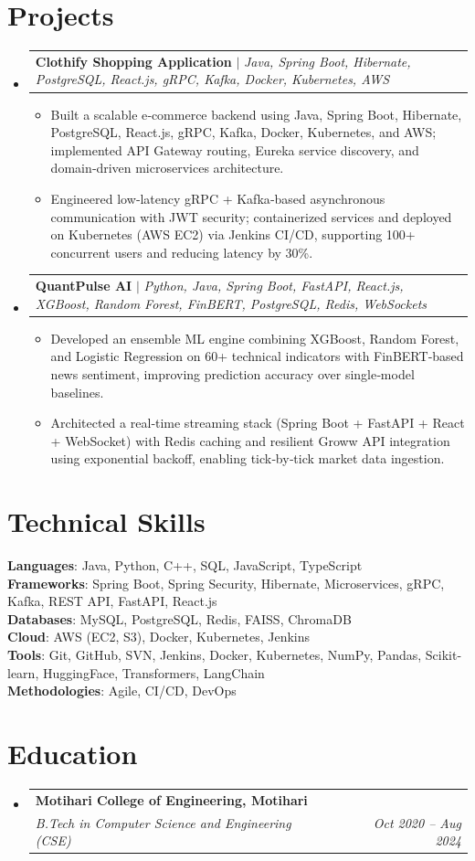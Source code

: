 \documentclass[10pt, letterpaper]{article}
\makeatletter
\newcommand{\resumeItem}[1]{
  \item\small{
    {#1 \vspace{-2pt}}
  }
}
\newcommand{\resumeSubheading}[4]{
  \vspace{-2pt}\item
    \begin{tabular*}{1.0\textwidth}[t]{l@{\extracolsep{\fill}}r}
      \textbf{#1} & \textbf{\small #2} \\
      \textit{\small#3} & \textit{\small #4} \\
    \end{tabular*}\vspace{-7pt}
}
\newcommand{\resumeProjectHeading}[2]{
    \item
    \begin{tabular*}{1.0\textwidth}{l@{\extracolsep{\fill}}r}
      \small#1 & \textbf{\small #2} \\
    \end{tabular*}\vspace{-7pt}
}
\newcommand{\resumeSubHeadingListStart}{\begin{itemize}[leftmargin=0.0in, label={}]}
\newcommand{\resumeSubHeadingListEnd}{\end{itemize}}
\newcommand{\resumeItemListStart}{\begin{itemize}[leftmargin=0.15in]}
\newcommand{\resumeItemListEnd}{\end{itemize}\vspace{-5pt}}
\makeatother
\begin{document}
\section{Projects}
\resumeSubHeadingListStart
  \resumeProjectHeading{\textbf{Clothify Shopping Application} $|$ \emph{Java, Spring Boot, Hibernate, PostgreSQL, React.js, gRPC, Kafka, Docker, Kubernetes, AWS}}{}
    \resumeItemListStart
      \resumeItem{Built a scalable e‑commerce backend using Java, Spring Boot, Hibernate, PostgreSQL, React.js, gRPC, Kafka, Docker, Kubernetes, and AWS; implemented API Gateway routing, Eureka service discovery, and domain‑driven microservices architecture.}
      \resumeItem{Engineered low‑latency gRPC + Kafka‑based asynchronous communication with JWT security; containerized services and deployed on Kubernetes (AWS EC2) via Jenkins CI/CD, supporting 100+ concurrent users and reducing latency by 30\%.}
    \resumeItemListEnd
  \resumeProjectHeading{\textbf{QuantPulse AI} $|$ \emph{Python, Java, Spring Boot, FastAPI, React.js, XGBoost, Random Forest, FinBERT, PostgreSQL, Redis, WebSockets}}{}
    \resumeItemListStart
      \resumeItem{Developed an ensemble ML engine combining XGBoost, Random Forest, and Logistic Regression on 60+ technical indicators with FinBERT‑based news sentiment, improving prediction accuracy over single‑model baselines.}
      \resumeItem{Architected a real‑time streaming stack (Spring Boot + FastAPI + React + WebSocket) with Redis caching and resilient Groww API integration using exponential backoff, enabling tick‑by‑tick market data ingestion.}
    \resumeItemListEnd
\resumeSubHeadingListEnd


\section{Technical Skills}
\begin{itemize}[leftmargin=0.15in, label={}]
  \small{\item{
    \textbf{Languages}{: Java, Python, C++, SQL, JavaScript, TypeScript} \\
    \textbf{Frameworks}{: Spring Boot, Spring Security, Hibernate, Microservices, gRPC, Kafka, REST API, FastAPI, React.js} \\
    \textbf{Databases}{: MySQL, PostgreSQL, Redis, FAISS, ChromaDB} \\
    \textbf{Cloud}{: AWS (EC2, S3), Docker, Kubernetes, Jenkins} \\
    \textbf{Tools}{: Git, GitHub, SVN, Jenkins, Docker, Kubernetes, NumPy, Pandas, Scikit-learn, HuggingFace, Transformers, LangChain} \\
    \textbf{Methodologies}{: Agile, CI/CD, DevOps} \\
  }}
\end{itemize}


\section{Education}
\resumeSubHeadingListStart
  \resumeSubheading{Motihari College of Engineering, Motihari}{}{B.Tech in Computer Science and Engineering (CSE)}{Oct 2020 -- Aug 2024}
\resumeSubHeadingListEnd
\end{document}
